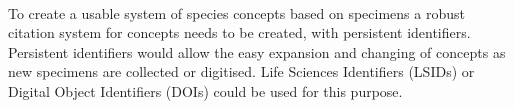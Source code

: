 \documentclass{article}
\begin{document}
   \paragraph{}
   To create a usable system of species concepts based on specimens a robust citation system for concepts needs to be created, with persistent identifiers. Persistent identifiers would allow the easy expansion and changing of concepts as new specimens are collected or digitised. Life Sciences Identifiers (LSIDs) or Digital Object Identifiers (DOIs) could be used for this purpose.
   
   \printbibliography
\end{document}
